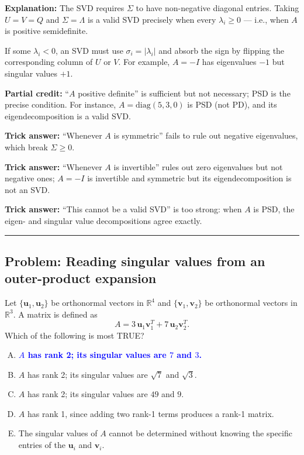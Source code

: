 \documentclass[12pt]{amsart}
\newcommand{\divider}{
  \vspace{-1em}
  \noindent
  \raisebox{-0.15ex}{\textbullet}%
  \hspace{0.5em}%
  \rule[0.5ex]{0.95\textwidth}{1.0pt}%
  \hspace{0.5em}%
  \raisebox{-0.15ex}{\textbullet}%
  \vspace{0em}
}
\begin{document}
\textbf{Explanation:}
The SVD requires $\Sigma$ to have non-negative diagonal entries.
Taking $U = V = Q$ and $\Sigma = \Lambda$ is a valid SVD precisely when every
$\lambda_i \geq 0$ --- i.e., when $A$ is positive semidefinite.

If some $\lambda_i < 0$, an SVD must use $\sigma_i = |\lambda_i|$ and absorb the
sign by flipping the corresponding column of $U$ or $V$. For example, $A = -I$
has eigenvalues $-1$ but singular values $+1$.

\textbf{Partial credit:}
``$A$ positive definite'' is sufficient but not necessary; PSD is the precise
condition. For instance, $A = \mathrm{diag}(5, 3, 0)$ is PSD (not PD),
and its eigendecomposition is a valid SVD.

\textbf{Trick answer:}
``Whenever $A$ is symmetric'' fails to rule out negative eigenvalues, which
break $\Sigma \geq 0$.

\textbf{Trick answer:}
``Whenever $A$ is invertible'' rules out zero eigenvalues but not negative ones;
$A = -I$ is invertible and symmetric but its eigendecomposition is not an SVD.

\textbf{Trick answer:}
``This cannot be a valid SVD'' is too strong: when $A$ is PSD, the eigen- and
singular value decompositions agree exactly.

\divider

\subsection*{Problem: Reading singular values from an outer-product expansion}

Let $\{\mathbf{u}_1, \mathbf{u}_2\}$ be orthonormal vectors in $\mathbb{R}^4$ and
$\{\mathbf{v}_1, \mathbf{v}_2\}$ be orthonormal vectors in $\mathbb{R}^3$.
A matrix is defined as
$$A = 3\,\mathbf{u}_1\mathbf{v}_1^T + 7\,\mathbf{u}_2\mathbf{v}_2^T.$$
Which of the following is most TRUE?

\begin{enumerate}[(A)]
\item \textcolor{blue}{\textbf{$A$ has rank 2; its singular values are $7$ and $3$.}}
\item $A$ has rank 2; its singular values are $\sqrt{7}$ and $\sqrt{3}$.
\item $A$ has rank 2; its singular values are $49$ and $9$.
\item $A$ has rank 1, since adding two rank-1 terms produces a rank-1 matrix.
\item The singular values of $A$ cannot be determined without knowing the
specific entries of the $\mathbf{u}_i$ and $\mathbf{v}_i$.
\end{enumerate}
\end{document}
